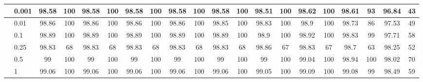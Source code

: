 \begin{table}
{\begin{tabular}{|l|l|c|c|c|c|c|c|c|c|c|c|c|c|c|c|c|c|c|c|}
          & 0.001    & 98.58        & 100       & 98.58        & 100       & 98.58        & 100       & 98.58        & 100       & 98.58        & 100       & 98.51        & 100       & 98.62        & 100       & 98.61        & 93        & 96.84        & 43        \\ \hline
          & 0.01     & 98.86        & 100       & 98.86        & 100       & 98.86        & 100       & 98.86        & 100       & 98.85        & 100       & 98.83        & 100       & 98.9         & 100       & 98.73        & 86        & 97.53        & 49        \\ \hline
          & 0.1      & 98.89        & 100       & 98.89        & 100       & 98.89        & 100       & 98.89        & 100       & 98.89        & 100       & 98.9         & 100       & 98.92        & 100       & 98.83        & 99        & 97.71        & 58        \\ \hline
          & 0.25     & 98.83        & 68        & 98.83        & 68        & 98.83        & 68        & 98.83        & 68        & 98.83        & 68        & 98.86        & 67        & 98.83        & 67        & 98.7         & 63        & 98.25        & 52        \\ \hline
          & 0.5      & 99           & 100       & 99           & 100       & 99           & 100       & 99           & 100       & 99           & 100       & 99           & 100       & 99.04        & 100       & 98.94        & 100       & 98.02        & 70        \\ \hline
          & 1        & 99.06        & 100       & 99.06        & 100       & 99.06        & 100       & 99.06        & 100       & 99.06        & 100       & 99.05        & 100       & 99.09        & 100       & 99.08        & 99        & 98.49        & 59        \\ \hline
\end{tabular}
}
\end{table}